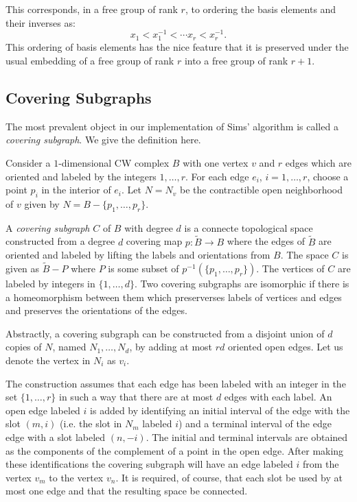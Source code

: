 \documentclass[12pt]{article}
\theoremstyle{definition}
\renewcommand{\tilde}{\widetilde}
\begin{document}
   This corresponds, in a free group of rank $r$,  to ordering the basis
   elements and their inverses as:
   $$x_1 < x_1^{-1} < \cdots x_r < x_r^{-1}.$$
   This ordering of basis elements has the nice feature that it is preserved
   under the usual embedding of a free group of rank $r$ into a free group of
   rank $r+1$.

   \subsection{Covering Subgraphs}
   The most prevalent object in our implementation of Sims' algorithm is called
   a {\it covering subgraph}.  We give the definition here.

   Consider a $1$-dimensional CW complex $B$ with one vertex $v$ and $r$ edges
   which are oriented and labeled by the integers $1, \ldots, r$.  For each edge
   $e_i$, $i = 1, \ldots, r$, choose a point $p_i$ in the interior of $e_i$.  Let
   $N = N_v$ be the contractible open neighborhood of $v$ given by
   $N = B - \{p_1, \ldots, p_r\}$.

   A {\it covering subgraph} $C$ of $B$ with degree $d$ is a connecte
   topological space constructed from a degree $d$ covering map
   $p:\tilde B \to B$ where the edges of $\tilde B$ are oriented and labeled by
   lifting the labels and orientations from $B$.  The space $C$ is given as
   $\tilde B - P$ where $P$ is some subset of $p^{-1}(\{p_1, \ldots, p_r\})$.
   The vertices of $C$ are labeled by integers in $\{1, \ldots, d\}$.  Two
   covering subgraphs are isomorphic if there is a homeomorphism between them
   which preserverses labels of vertices and edges and preserves the orientations
   of the edges.

   Abstractly, a covering subgraph can be constructed from a disjoint union of
   $d$ copies of $N$, named $N_1, \ldots, N_d$, by adding at most $rd$ oriented
   open edges.  Let us denote the vertex in $N_i$ as $v_i$.

   The construction assumes that each edge has been labeled with an integer in
   the set $\{1, \ldots, r\}$ in such a way that there are at most $d$ edges
   with each label.  An open edge labeled $i$ is added by identifying an initial
   interval of the edge with the slot $(m, i)$ (i.e. the slot in $N_m$ labeled
   $i$) and a terminal interval of the edge edge with a slot labeled $(n,-i)$.
   The initial and terminal intervals are obtained as the components of the
   complement of a point in the open edge.  After making these identifications
   the covering subgraph will have an edge labeled $i$ from the vertex $v_m$ to
   the vertex $v_n$.  It is required, of course, that each slot be used by at
   most one edge and that the resulting space be connected.
\end{document}
